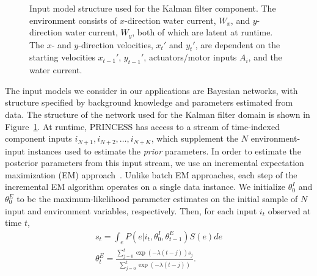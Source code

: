 \documentclass[letterpaper]{article}
\begin{document}
\begin{figure}[t]
	\centering
	\caption{Input model structure used for the Kalman filter component. The environment consists of $x$-direction water current, $W_x$, and $y$-direction water current, $W_y$, both of which are latent at runtime. The $x$- and $y$-direction velocities, $x_t'$ and $y_t'$, are dependent on the starting velocities $x_{t-1}'$, $y_{t-1}'$, actuators/motor inputs $A_i$, and the water current.}
	\label{fig:kalman-filter-input-model}
\end{figure}

The input models we consider in our applications are Bayesian networks, with structure specified by background knowledge and parameters estimated from data.
The structure of the network used for the Kalman filter domain is shown in Figure~\ref{fig:kalman-filter-input-model}.
At runtime, PRINCESS has access to a stream of time-indexed component inputs $i_{N+1}, i_{N+2}, \ldots, i_{N+K}$, which supplement the $N$ environment-input instances used to estimate the \emph{prior} parameters.
In order to estimate the posterior parameters from this input stream, we use an incremental expectation maximization (EM) approach~\cite{neal1998view}.
Unlike batch EM approaches, each step of the incremental EM algorithm operates on a single data instance.
We initialize $\theta_0^I$ and $\theta_0^E$ to be the maximum-likelihood parameter estimates on the initial sample of $N$ input and environment variables, respectively. Then, for each input $i_t$ observed at time $t$,
\begin{align}
s_t = \int_e P(e | i_t, \theta_0^I, \theta_{t-1}^E) S(e) de 
\label{eq:suff-stats-integral} \\ 
\theta^E_t = \frac{\sum_{j=0}^t \exp(-\lambda (t - j)) s_j}{\sum_{j=0}^t \exp(-\lambda (t - j))}.
\end{align}
\end{document}
